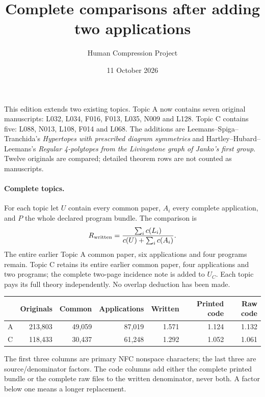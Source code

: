 \documentclass[11pt,a4paper]{article}
\title{Complete comparisons after adding two applications}
\author{Human Compression Project}\date{11 October 2026}
\begin{document}
\maketitle
This edition extends two existing topics. Topic A now contains seven original manuscripts: L032, L034, F016, F013, L035, N009 and L128. Topic C contains five: L088, N013, L108, F014 and L068. The additions are Leemans--Spiga--Tranchida's \emph{Hypertopes with prescribed diagram symmetries} and Hartley--Hubard--Leemans's \emph{Regular 4-polytopes from the Livingstone graph of Janko's first group}. Twelve originals are compared; detailed theorem rows are not counted as manuscripts.

\paragraph{Complete topics.}
For each topic let $U$ contain every common paper, $A_i$ every complete application, and $P$ the whole declared program bundle. The comparison is
\[
R_{\rm written}=\frac{\sum_i c(L_i)}{c(U)+\sum_i c(A_i)}.
\]
The entire earlier Topic A common paper, six applications and four programs remain. Topic C retains its entire earlier common paper, four applications and two programs; the complete two-page incidence note is added to $U_C$. Each topic pays its full theory independently. No overlap deduction has been made.
\begin{center}\small\begin{tabular}{lrrr|rrr}\toprule
 & Originals & Common & Applications & Written & Printed code & Raw code\\\midrule
A & 213,803 & 49,059 & 87,019 & 1.571 & 1.124 & 1.132 \\
C & 118,433 & 30,437 & 61,248 & 1.292 & 1.052 & 1.061 \\
\bottomrule\end{tabular}\end{center}
The first three columns are primary NFC nonspace characters; the last three are source/denominator factors. The code columns add either the complete printed bundle or the complete raw files to the written denominator, never both. A factor below one means a longer replacement.
\end{document}

